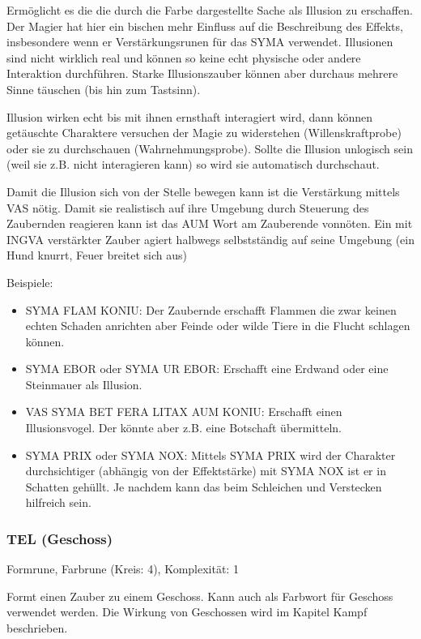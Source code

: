 \documentclass{article}
\begin{document}
Ermöglicht es die die durch die Farbe dargestellte Sache als Illusion zu erschaffen. Der Magier hat hier ein bischen
mehr Einfluss auf die Beschreibung des Effekts, insbesondere wenn er Verstärkungsrunen für das SYMA verwendet.
Illusionen sind nicht wirklich real und können so keine echt physische oder andere Interaktion durchführen. Starke
Illusionszauber können aber durchaus mehrere Sinne täuschen (bis hin zum Tastsinn).

Illusion wirken echt bis mit ihnen ernsthaft interagiert wird, dann können getäuschte Charaktere versuchen der Magie
zu widerstehen (Willenskraftprobe) oder sie zu durchschauen (Wahrnehmungsprobe). Sollte die Illusion unlogisch sein
(weil sie z.B. nicht interagieren kann) so wird sie automatisch durchschaut.

Damit die Illusion sich von der Stelle bewegen kann ist die Verstärkung mittels VAS nötig. Damit sie realistisch auf
ihre Umgebung durch Steuerung des Zaubernden reagieren kann ist das AUM Wort am Zauberende vonnöten. Ein mit INGVA
verstärkter Zauber agiert halbwegs selbstständig auf seine Umgebung (ein Hund knurrt, Feuer breitet sich aus)

Beispiele:

\begin{itemize}
\item SYMA FLAM KONIU: Der Zaubernde erschafft Flammen die zwar keinen echten Schaden anrichten aber Feinde oder wilde Tiere in die Flucht schlagen können.
\item SYMA EBOR oder SYMA UR EBOR: Erschafft eine Erdwand oder eine Steinmauer als Illusion.
\item VAS SYMA BET FERA LITAX AUM KONIU: Erschafft einen Illusionsvogel. Der könnte aber z.B. eine Botschaft übermitteln.
\item SYMA PRIX oder SYMA NOX: Mittels SYMA PRIX wird der Charakter durchsichtiger (abhängig von der Effektstärke) mit SYMA NOX ist er in Schatten gehüllt. Je nachdem kann das beim Schleichen und Verstecken hilfreich sein.
\end{itemize}

\subsubsection{TEL (Geschoss)}

Formrune, Farbrune (Kreis: 4), Komplexität: 1

Formt einen Zauber zu einem Geschoss. Kann auch als Farbwort für Geschoss verwendet werden. Die Wirkung von
Geschossen wird im Kapitel Kampf beschrieben.
\end{document}
